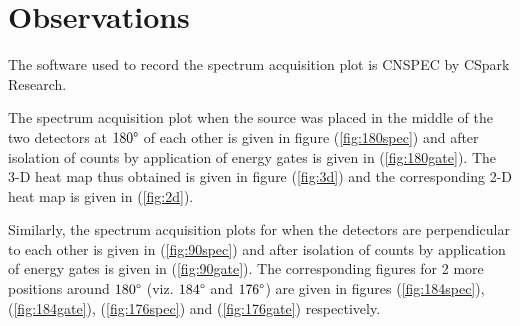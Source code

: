 \documentclass[%
 reprint,
nofootinbib,
 amsmath,amssymb,
 aps,
floatfix,
]{revtex4-2}
\begin{document}
\section{Observations}
    The software used to record the spectrum acquisition plot is CNSPEC by CSpark Research.
    \par
    The spectrum acquisition plot when the source was placed in the middle of the two detectors at $180 \degree$ of each other is given in figure (\ref{fig:180spec}) and after isolation of counts by application of energy gates is given in (\ref{fig:180gate}). The 3-D heat map thus obtained is given in figure (\ref{fig:3d}) and the corresponding 2-D heat map is given in (\ref{fig:2d}). 
    \par
    Similarly, the spectrum acquisition plots for when the detectors are perpendicular to each other is given in (\ref{fig:90spec}) and after isolation of counts by application of energy gates is given in (\ref{fig:90gate}). The corresponding figures for 2 more positions around $180 \degree$ (viz. $184 \degree$ and $176 \degree$) are given in figures (\ref{fig:184spec}), (\ref{fig:184gate}), (\ref{fig:176spec}) and (\ref{fig:176gate}) respectively.
\end{document}
